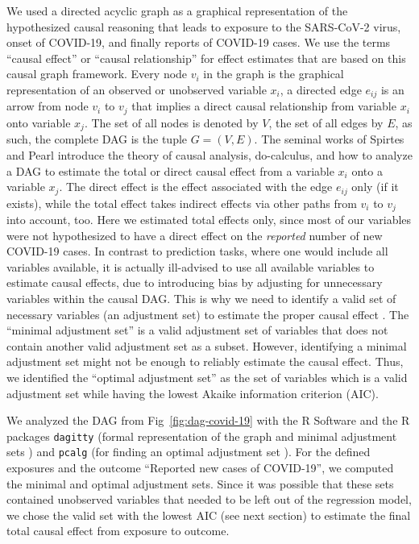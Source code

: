 \documentclass[10pt,letterpaper]{article}
\begin{document}
We used a directed acyclic graph as a graphical representation of the
hypothesized causal reasoning that leads to exposure to the SARS-CoV-2
virus, onset of COVID-19, and finally reports of COVID-19 cases. We use the terms ``causal effect'' or ``causal relationship'' for effect estimates that are based on this causal graph framework. Every
node \(v_i\) in the graph is the graphical representation of an observed
or unobserved variable \(x_i\), a directed edge \(e_{ij}\) is an arrow
from node \(v_i\) to \(v_j\) that implies a direct causal relationship
from variable \(x_i\) onto variable \(x_j\). The set of all nodes is
denoted by \(V\), the set of all edges by \(E\), as such, the complete
DAG is the tuple \(G=(V,E)\). The seminal works of Spirtes and Pearl
\cite{spirtes2000causation, pearl2009causality} introduce the theory of
causal analysis, do-calculus, and how to analyze a DAG to estimate the
total or direct causal effect from a variable \(x_i\) onto a variable
\(x_j\). The direct effect is the effect associated with the edge
\(e_{ij}\) only (if it exists), while the total effect takes indirect
effects via other paths from \(v_i\) to \(v_j\) into account, too. Here
we estimated total effects only, since most of our variables were not
hypothesized to have a direct effect on the \emph{reported} number of
new COVID-19 cases. In contrast to prediction tasks, where one would
include all variables available, it is actually ill-advised to use all
available variables to estimate causal effects, due to introducing bias
by adjusting for unnecessary variables within the causal DAG. This is
why we need to identify a valid set of necessary variables (an
adjustment set) to estimate the proper causal effect
\cite{pearl2009causality}. The ``minimal adjustment set''
\cite{greenland1999causal} is a valid adjustment set of variables that
does not contain another valid adjustment set as a subset. However,
identifying a minimal adjustment set might not be enough to reliably
estimate the causal effect. Thus, we identified the ``optimal adjustment
set'' \cite{henckel2019graphical} as the set of variables which is a
valid adjustment set while having the lowest Akaike information criterion (AIC).

We analyzed the DAG from Fig~\ref{fig:dag-covid-19} with the R Software
\cite{rsoftware} and the R packages \texttt{dagitty} (formal
representation of the graph and minimal adjustment sets
\cite{textor_robust_2017}) and \texttt{pcalg} (for finding an optimal
adjustment set \cite{pcalg}). For the defined exposures and the outcome
``Reported new cases of COVID-19'', we computed the minimal and optimal
adjustment sets. Since it was possible that these sets contained unobserved variables that needed to be left out of the regression model, we chose the valid set with the lowest AIC (see next section) to estimate the final total causal effect from exposure to outcome.
\end{document}
